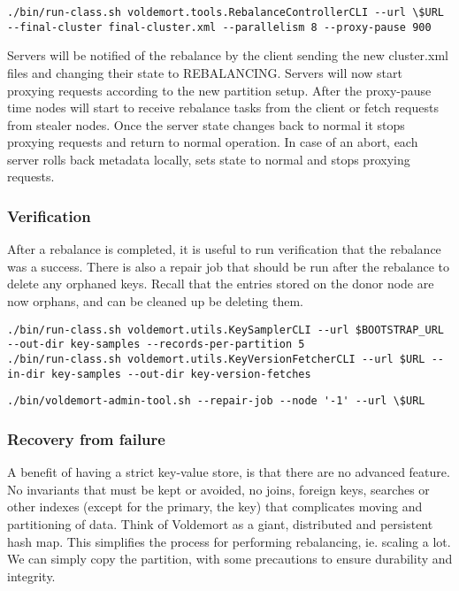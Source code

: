 \begin{lstlisting}[style=customc, caption=Sample command to execute the rebalance. Parallelism defines how many tasks can be run at the same time.]
./bin/run-class.sh voldemort.tools.RebalanceControllerCLI --url \$URL  --final-cluster final-cluster.xml --parallelism 8 --proxy-pause 900
\end{lstlisting}

Servers will be notified of the rebalance by the client sending the new cluster.xml files and changing their state to REBALANCING. Servers will now start proxying requests according to the new partition setup. After the proxy-pause time nodes will start to receive rebalance tasks from the client or fetch requests from stealer nodes. Once the server state changes back to normal it stops proxying requests and return to normal operation. In case of an abort, each server rolls back metadata locally, sets state to normal and stops proxying requests. 

\subsubsection{Verification}
After a rebalance is completed, it is useful to run verification that the rebalance was a success. There is also a repair job that should be run after the rebalance to delete any orphaned keys. Recall that the entries stored on the donor node are now orphans, and can be cleaned up be deleting them.

\begin{lstlisting}[style=customc, caption=Commands for pulling a key sample from a store and the versioned data objects stored under the keys. These are used to verify that the rebalance worked]
./bin/run-class.sh voldemort.utils.KeySamplerCLI --url $BOOTSTRAP_URL --out-dir key-samples --records-per-partition 5
./bin/run-class.sh voldemort.utils.KeyVersionFetcherCLI --url $URL --in-dir key-samples --out-dir key-version-fetches
\end{lstlisting}

\begin{lstlisting}[style=customc, caption=Sample repair job script. Passing -1 as node will run the script on all nodes.]
./bin/voldemort-admin-tool.sh --repair-job --node '-1' --url \$URL
\end{lstlisting}

\subsubsection{Recovery from failure}
A benefit of having a strict key-value store, is that there are no advanced feature. No invariants that must be kept or avoided, no joins, foreign keys, searches or other indexes (except for the primary, the key) that complicates moving and partitioning of data. 
Think of Voldemort as a giant, distributed and persistent hash map.
This simplifies the process for performing rebalancing, ie. scaling a lot. We can simply copy the partition, with some precautions to ensure durability and integrity.

